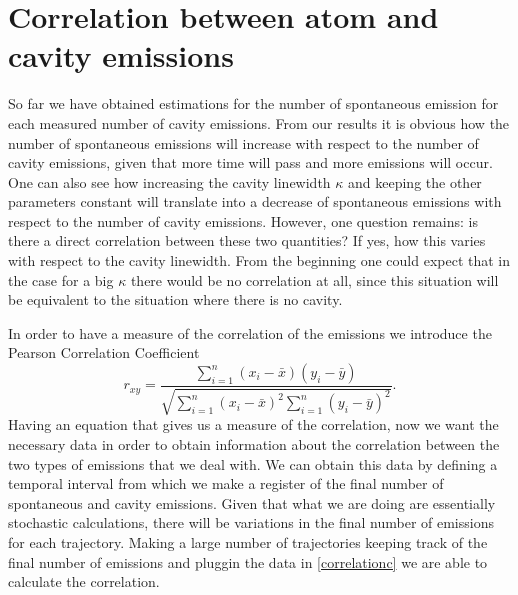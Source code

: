 \documentclass[conference]{IEEEtran}
\begin{document}
\section{Correlation between atom and cavity emissions}
So far we have obtained estimations for the number of spontaneous emission for each measured number of cavity emissions. From our results it is obvious how the number of spontaneous emissions will increase with respect to the number of cavity emissions, given that more time will pass and more emissions will occur. One can also see how increasing the cavity linewidth $\kappa$ and keeping the other parameters constant will translate into a decrease of spontaneous emissions with respect to the number of cavity emissions. However, one question remains: is there a direct correlation between these two quantities? If yes, how this varies with respect to the cavity linewidth. From the beginning one could expect that in the case for a big $\kappa$ there would be no correlation at all, since this situation will be equivalent to the situation where there is no cavity. 

In order to have a measure of the correlation of the emissions we introduce the Pearson Correlation Coefficient \cite{benesty2009pearson}
\begin{equation} 
r_{xy} = \frac{\sum\limits_{i=1}^n(x_i - \bar{x})(y_i - \bar{y})}{\sqrt{\sum\limits_{i=1}^n(x_i - \bar{x})^2\sum\limits_{i=1}^n(y_i - \bar{y})^2}}.  \label{correlationc}
\end{equation}
Having an equation that gives us a measure of the correlation, now we want the necessary data in order to obtain information about the correlation between the two types of emissions that we deal with. We can obtain this data by defining a temporal interval from which we make a register of the final number of spontaneous and cavity emissions. Given that what we are doing are essentially stochastic calculations, there will be variations in the final number of emissions for each trajectory. Making a large number of trajectories keeping track of the final number of emissions and pluggin the data in \eqref{correlationc} we are able to calculate the correlation.
\end{document}
